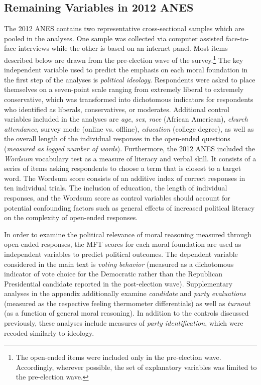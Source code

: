 \documentclass[12pt]{article}
\begin{document}
\subsection{Remaining Variables in 2012 ANES}

The 2012 ANES contains two representative cross-sectional samples which are pooled in the analyses. One sample was collected via computer assisted face-to-face interviews while the other is based on an internet panel. Most items described below are drawn from the pre-election wave of the survey.\footnote{The open-ended items were included only in the pre-election wave. Accordingly, wherever possible, the set of explanatory variables was limited to the pre-election wave.} The key independent variable used to predict the emphasis on each moral foundation in the first step of the analyses is \textit{political ideology}. Respondents were asked to place themselves on a seven-point scale ranging from extremely liberal to extremely conservative, which was transformed into dichotomous indicators for respondents who identified as liberals, conservatives, or moderates. Additional control variables included in the analyses are \textit{age}, \textit{sex}, \textit{race} (African American), \textit{church attendance}, survey mode (online vs. offline), \textit{education} (college degree), as well as the overall length of the individual responses in the open-ended questions (\textit{measured as logged number of words}). Furthermore, the 2012 ANES included the \textit{Wordsum} vocabulary test as a measure of literacy and verbal skill. It consists of a series of items asking respondents to choose a term that is closest to a target word. The Wordsum score consists of an additive index of correct responses in ten individual trials. The inclusion of education, the length of individual responses, and the Wordsum score as control variables should account for potential confounding factors such as general effects of increased political literacy on the complexity of open-ended responses.

In order to examine the political relevance of moral reasoning measured through open-ended responses, the MFT scores for each moral foundation are used as independent variables to predict political outcomes. The dependent variable considered in the main text is \textit{voting behavior} (measured as a dichotomous indicator of vote choice for the Democratic rather than the Republican Presidential candidate reported in the post-election wave). Supplementary analyses in the appendix additionally examine \textit{candidate} and \textit{party evaluations} (measured as the respective feeling thermometer differentials) as well as \textit{turnout} (as a function of general moral reasoning). In addition to the controls discussed previously, these analyses include measures of \textit{party identification}, which were recoded similarly to ideology.
\end{document}
